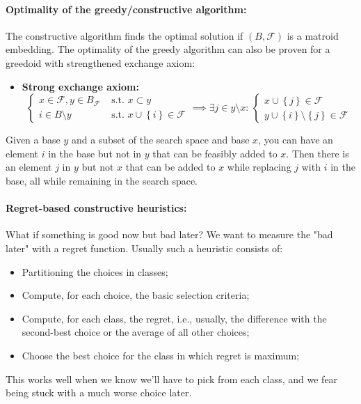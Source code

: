 \documentclass{article}
\begin{document}
	\paragraph{Optimality of the greedy/constructive algorithm:} The constructive algorithm finds the optimal solution if $(B, \mathcal{F})$ is a matroid embedding. The optimality of the greedy algorithm can also be proven for a greedoid with strengthened exchange axiom: 
	\begin{itemize}
		\item \textbf{Strong exchange axiom:}
		$$ 
		\begin{cases}
			x \in \mathcal{F}, y \in B_{\mathcal{F}} & \text{ s.t. } x \subset y \\
			i \in B \setminus y & \text{ s.t. } x \cup \left\{i\right\} \in \mathcal{F}
		\end{cases}
		\implies \exists j \in y \setminus x: \, 
		\begin{cases}
			x \cup \left\{j\right\} \in \mathcal{F} \\
			y \cup \left\{i\right\} \setminus \left\{j\right\} \in \mathcal{F}
		\end{cases}
		$$
	\end{itemize}
	Given a base $y$ and a subset of the search space and base $x$, you can have an element $i$ in the base but not in $y$ that can be feasibly added to $x$. Then there is an element $j$ in $y$ but not $x$ that can be added to $x$ while replacing $j$ with $i$ in the base, all while remaining in the search space.\\
	
	\paragraph{Regret-based constructive heuristics:} What if something is good now but bad later? We want to measure the "bad later" with a regret function. Usually such a heuristic consists of:
	\begin{itemize}
		\item Partitioning the choices in classes;
		\item Compute, for each choice, the basic selection criteria;
		\item Compute, for each class, the regret, i.e., usually, the difference with the second-best choice or the average of all other choices;
		\item Choose the best choice for the class in which regret is maximum;
	\end{itemize}
	This works well when we know we'll have to pick from each class, and we fear being stuck with a much worse choice later.\\
	
\end{document}
